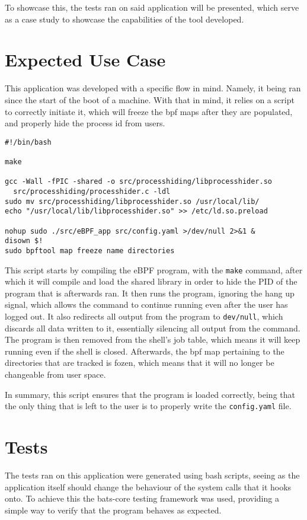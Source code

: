 To showcase this, the tests ran on said application will be presented, which serve as a case study to showcase the capabilities of the tool developed.

\section{Expected Use Case}
This application was developed with a specific flow in mind. Namely, it being ran since the start of the boot of a machine. With that in mind, it relies on a script to correctly initiate it, which will freeze the bpf maps after they are populated, and properly hide the process id from users.

\begin{lstlisting}
#!/bin/bash

make

gcc -Wall -fPIC -shared -o src/processhiding/libprocesshider.so 
  src/processhiding/processhider.c -ldl
sudo mv src/processhiding/libprocesshider.so /usr/local/lib/
echo "/usr/local/lib/libprocesshider.so" >> /etc/ld.so.preload

nohup sudo ./src/eBPF_app src/config.yaml >/dev/null 2>&1 &
disown $!
sudo bpftool map freeze name directories
\end{lstlisting}

This script starts by compiling the eBPF program, with the \texttt{make} command, after which it will compile and load the shared library in order to hide the PID of the program that is afterwards ran.
It then runs the program, ignoring the hang up signal, which allows the command to continue running even after the user has logged out. It also redirects all output from the program to \texttt{dev/null}, which discards all data written to it, essentially silencing all output from the command. The program is then removed from the shell's job table, which means it will keep running even if the shell is closed.
Afterwards, the bpf map pertaining to the directories that are tracked is fozen, which means that it will no longer be changeable from user space.

In summary, this script ensures that the program is loaded correctly, being that the only thing that is left to the user is to properly write the \texttt{config.yaml} file.


\section{Tests}
The tests ran on this application were generated using bash scripts, seeing as the application itself should change the behaviour of the system calls that it hooks onto. To achieve this the \cite{bats}{bats-core} testing framework was used, providing a simple way to verify that the program behaves as expected.

